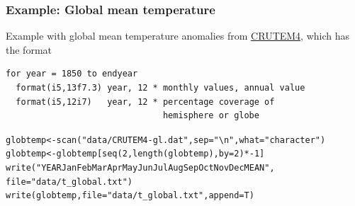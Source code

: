 \documentclass[xcolor=table, xcolor=dvipsnames]{beamer}\usepackage[]{graphicx}\usepackage[]{color}
\makeatletter
\newcommand{\hlnum}[1]{\textcolor[rgb]{0,0,0}{#1}}
\newcommand{\hlstr}[1]{\textcolor[rgb]{0.545,0.137,0.137}{#1}}
\newcommand{\hlopt}[1]{\textcolor[rgb]{0,0,0}{#1}}
\newcommand{\hlstd}[1]{\textcolor[rgb]{0,0,0}{#1}}
\newcommand{\hlkwb}[1]{\textcolor[rgb]{0,0,0}{#1}}
\newcommand{\hlkwc}[1]{\textcolor[rgb]{1,0,1}{#1}}
\newcommand{\hlkwd}[1]{\textcolor[rgb]{0,0,1}{#1}}
\newenvironment{kframe}{%
 \def\at@end@of@kframe{}%
 \ifinner\ifhmode%
  \def\at@end@of@kframe{\end{minipage}}%
  \begin{minipage}{\columnwidth}%
 \fi\fi%
 \def\FrameCommand##1{\hskip\@totalleftmargin \hskip-\fboxsep
 \colorbox{shadecolor}{##1}\hskip-\fboxsep
     \hskip-\linewidth \hskip-\@totalleftmargin \hskip\columnwidth}%
 \MakeFramed {\advance\hsize-\width
   \@totalleftmargin\z@ \linewidth\hsize
   \@setminipage}}%
 {\par\unskip\endMakeFramed%
 \at@end@of@kframe}
\newenvironment{knitrout}{}{} %
\makeatother
\begin{document}

\begin{frame}[fragile]\frametitle{Example: Global mean temperature}
Example with global mean temperature anomalies from \href{http://www.cru.uea.ac.uk/cru/data/temperature/CRUTEM4-gl.dat}{CRUTEM4}, which has the format
\begin{verbatim}
for year = 1850 to endyear
  format(i5,13f7.3) year, 12 * monthly values, annual value
  format(i5,12i7)   year, 12 * percentage coverage of 
                               hemisphere or globe
\end{verbatim} %
\begin{knitrout}\footnotesize
{}\color{fgcolor}\begin{kframe}
\begin{alltt}
\hlstd{globtemp} \hlkwb{<-} \hlkwd{scan}\hlstd{(}\hlstr{"data/CRUTEM4-gl.dat"}\hlstd{,} \hlkwc{sep}\hlstd{=}\hlstr{"\textbackslash{}n"}\hlstd{,} \hlkwc{what}\hlstd{=}\hlstr{"character"}\hlstd{)}
\hlstd{globtemp} \hlkwb{<-} \hlstd{globtemp[}\hlkwd{seq}\hlstd{(}\hlnum{2}\hlstd{,}\hlkwd{length}\hlstd{(globtemp),} \hlkwc{by} \hlstd{=}\hlnum{2}\hlstd{)}\hlopt{* -}\hlnum{1}\hlstd{]}
\hlkwd{write}\hlstd{(}\hlstr{"YEAR Jan Feb Mar Apr May Jun Jul Aug Sep Oct Nov Dec MEAN"}\hlstd{,}
      \hlkwc{file}\hlstd{=}\hlstr{"data/t_global.txt"}\hlstd{)}
\hlkwd{write}\hlstd{(globtemp,} \hlkwc{file}\hlstd{=}\hlstr{"data/t_global.txt"}\hlstd{,} \hlkwc{append}\hlstd{=T)}
\end{alltt}
\end{kframe}
\end{knitrout}
\end{frame}

\end{document}
